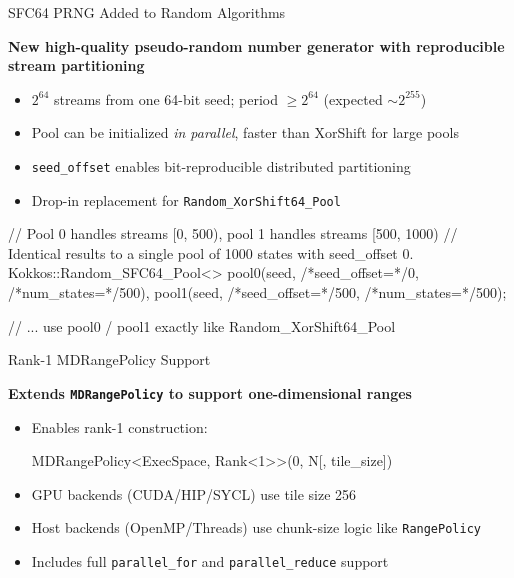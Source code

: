 \begin{frame}[fragile]{SFC64 PRNG Added to Random Algorithms}

  \textbf{New high-quality pseudo-random number generator with reproducible stream partitioning}

  \begin{itemize}
    \item $2^{64}$ streams from one 64-bit seed; period $\geq 2^{64}$ (expected $\sim 2^{255}$)
    \item Pool can be initialized \textit{in parallel}, faster than XorShift for large pools
    \item \texttt{seed\_offset} enables bit-reproducible distributed partitioning
    \item Drop-in replacement for \texttt{Random\_XorShift64\_Pool}
  \end{itemize}

  \begin{code}[keywords={Kokkos,Random_SFC64_Pool,parallel_for,rand,get_state,free_state,DefaultExecutionSpace,auto,uint64_t,double}]
    // Pool 0 handles streams [0, 500), pool 1 handles streams [500, 1000)
    // Identical results to a single pool of 1000 states with seed_offset 0.    
    Kokkos::Random_SFC64_Pool<> 
      pool0(seed, /*seed_offset=*/0,   /*num_states=*/500),
      pool1(seed, /*seed_offset=*/500, /*num_states=*/500);

    // ... use pool0 / pool1 exactly like Random_XorShift64_Pool
  \end{code}

\end{frame}


\begin{frame}[fragile]{Rank-1 MDRangePolicy Support}

  \textbf{Extends \texttt{MDRangePolicy} to support one-dimensional ranges}

  \vspace{15pt}

  \begin{itemize}
    \item Enables rank-1 construction: 
    
    \begin{code}[keywords={MDRangePolicy,ExecSpace,Rank}]
      MDRangePolicy<ExecSpace, Rank<1>>(0, N[, tile_size])
    \end{code}

    \item GPU backends (CUDA/HIP/SYCL) use tile size 256
    \item Host backends (OpenMP/Threads) use chunk-size logic like \texttt{RangePolicy}
    \item Includes full \texttt{parallel\_for} and \texttt{parallel\_reduce} support
  \end{itemize}

  \vspace{10pt}

\end{frame}

